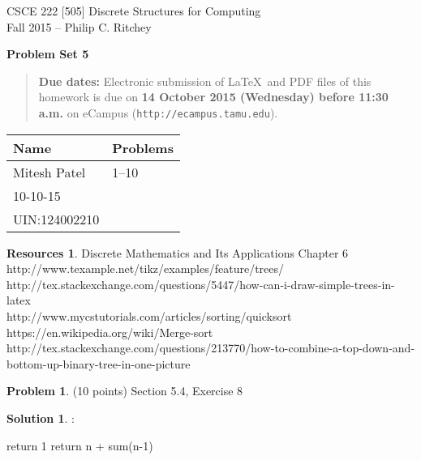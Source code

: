 \documentclass{article}
\theoremstyle{definition}
\newtheorem{problem}{Problem}
\newtheorem*{solution}{Solution}
\newtheorem*{resources}{Resources}
\newcommand{\names}[5]{
\begin{center}
\begin{tabular}{|ll|}
\hline
\textbf{Name}  & \textbf{Problems}\\
\hline
#1 & 1--10\\
#2 & #3\\
#4 & #5\\
\hline
\end{tabular}
\end{center}
}
\newcommand{\problemset}[1]{\begin{center}\textbf{Problem Set #1}\end{center}}
\newcommand{\duedate}[1]{\begin{quote}\textbf{Due dates:} Electronic
    submission of \LaTeX\ and PDF files of this homework is due on
    \textbf{#1} on eCampus (\texttt{http://ecampus.tamu.edu}). 
    \end{quote}}
\begin{document}
\begin{center}
{\large
CSCE 222 [505] Discrete Structures for Computing\\[.5ex]
Fall 2015 -- Philip C. Ritchey\\}
\end{center}

\problemset{5}

\duedate{14 October 2015 (Wednesday) before 11:30 a.m.}

\names{Mitesh Patel}
{10-10-15}{}
{UIN:124002210}{}

\begin{resources} Discrete Mathematics and Its Applications Chapter 6 \\
http://www.texample.net/tikz/examples/feature/trees/ \\
http://tex.stackexchange.com/questions/5447/how-can-i-draw-simple-trees-in-latex \\
http://www.mycstutorials.com/articles/sorting/quicksort \\
https://en.wikipedia.org/wiki/Merge-sort\\
http://tex.stackexchange.com/questions/213770/how-to-combine-a-top-down-and-bottom-up-binary-tree-in-one-picture

\end{resources}

\bigskip

\begin{problem} (10 points) Section 5.4, Exercise 8
\end{problem}
\begin{solution}:
\\
\begin{algorithm}
\caption{Recursive algorithm for finding sum of first n positive integers}
\label{}
\begin{algorithmic}[1]
        return 1
        \Else \State return n + sum(n-1)
        \EndIf
        
\EndProcedure
\end{algorithmic}
\end{algorithm}
\end{solution}

\newpage
\end{document}
